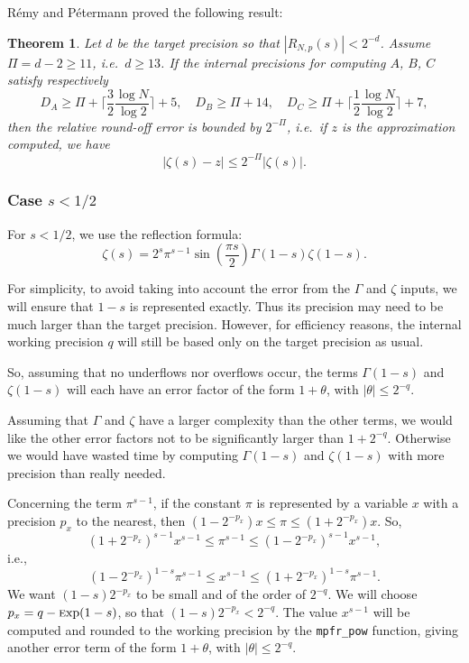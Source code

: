 \documentclass[12pt]{amsart}
\def\Exp{{\rm \textsc exp}}
\newtheorem{theorem}{Theorem}
\begin{document}
R\'emy and P\'etermann proved the following result:
\begin{theorem}
Let $d$ be the target precision so that $|R_{N,p}(s)| < 2^{-d}$.
Assume $\Pi = d - 2 \geq 11$, i.e.\ $d \geq 13$. If the internal precisions
for computing $A$, $B$, $C$ satisfy respectively
\[ D_A \geq \Pi + \lceil \frac{3}{2} \frac{\log N}{\log 2} \rceil + 5, \quad
   D_B \geq \Pi + 14, \quad
   D_C \geq \Pi + \lceil \frac{1}{2} \frac{\log N}{\log 2} \rceil + 7, \]
then the relative round-off error is bounded by $2^{-\Pi}$, i.e.\ if $z$ is
the approximation computed, we have
\[ |\zeta(s) - z| \leq 2^{-\Pi} |\zeta(s)|. \]
\end{theorem}

\subsubsection{Case $s < 1/2$}
\label{zeta:reflection}

For $s < 1/2$, we use the reflection formula:
\[ \zeta(s) = 2^s \pi^{s-1} \sin\left(\frac{\pi s}{2}\right) \Gamma(1-s)
   \zeta(1-s). \]

For simplicity, to avoid taking into account the error from the
$\Gamma$ and $\zeta$ inputs, we will ensure that $1-s$ is represented
exactly. Thus its precision may need to be much larger than the target
precision. However, for efficiency reasons, the internal working
precision $q$ will still be based only on the target precision as usual.

So, assuming that no underflows nor overflows occur, the terms
$\Gamma(1-s)$ and $\zeta(1-s)$ will each have an error factor of
the form $1+\theta$, with $|\theta| \leq 2^{-q}$.

Assuming that $\Gamma$ and $\zeta$ have a larger complexity than
the other terms, we would like the other error factors not to be
significantly larger than $1+2^{-q}$. Otherwise we would have wasted
time by computing $\Gamma(1-s)$ and $\zeta(1-s)$ with more precision
than really needed.

Concerning the term $\pi^{s-1}$, if the constant $\pi$ is represented
by a variable $x$ with a precision $p_x$ to the nearest, then
$(1-2^{-p_x}) x \leq \pi \leq (1+2^{-p_x}) x$. So,
\[ (1+2^{-p_x})^{s-1} x^{s-1} \leq \pi^{s-1} \leq
   (1-2^{-p_x})^{s-1} x^{s-1}, \]
i.e.,
\[ (1-2^{-p_x})^{1-s} \pi^{s-1} \leq x^{s-1} \leq
   (1+2^{-p_x})^{1-s} \pi^{s-1}. \]
We want $(1-s) 2^{-p_x}$ to be small and of the order of $2^{-q}$.
We will choose $p_x = q - \Exp(1-s)$, so that $(1-s) 2^{-p_x} < 2^{-q}$.
The value $x^{s-1}$ will be computed and rounded to the working precision
by the \texttt{mpfr\_pow} function, giving another error term of the form
$1+\theta$, with $|\theta| \leq 2^{-q}$.
\end{document}
